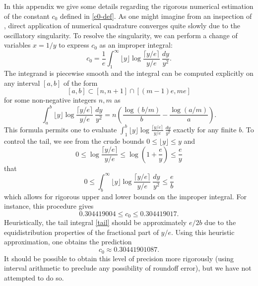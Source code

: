 \documentclass[12pt,a4paper,reqno]{amsart}
\numberwithin{equation}{section}
\theoremstyle{plain}
\theoremstyle{definition}
\begin{document}
In this appendix we give some details regarding the rigorous numerical estimation of the constant $c_0$ defined in \eqref{c0-def}.  As one might imagine from an inspection of , direct application of numerical quadrature converges quite slowly due to the oscillatory singularity.  To resolve the singularity, we can perform a change of variables $x=1/y$ to express $c_0$ as an improper integral:
\begin{equation}\label{c0-alt}
   c_0 = \frac{1}{e} \int_1^\infty \lfloor y \rfloor \log \frac{\lceil y/e \rceil}{y/e}\ \frac{dy}{y^2}.
\end{equation}
The integrand is piecewise smooth and the integral can be computed explicitly on any interval $[a,b]$ of the form
$$ [a,b] \subset [n, n+1] \cap [(m-1)e, me]$$
for some non-negative integers $n,m$ as
$$ \int_a^b \lfloor y \rfloor \log \frac{\lceil y/e \rceil}{y/e}\ \frac{dy}{y^2} = n (\frac{\log(b/m)}{b} - \frac{\log(a/m)}{a}).$$
This formula permits one to evaluate $\int_1^b \lfloor y \rfloor \log \frac{\lceil y/e \rceil}{y/e}\ \frac{dy}{y^2}$ exactly for any finite $b$.  To control the tail, we see from the crude bounds $0 \leq \lfloor y \rfloor \leq y$ and
$$ 0 \leq \log \frac{\lceil y/e \rceil}{y/e} \leq \log 
\left(1 + \frac{e}{y}\right) \leq \frac{e}{y}
$$
that
\begin{equation}\label{tail}
   0 \leq \int_b^\infty \lfloor y \rfloor \log \frac{\lceil y/e \rceil}{y/e}\ \frac{dy}{y^2} \leq \frac{e}{b}
\end{equation}
which allows for rigorous upper and lower bounds on the improper integral.  For instance, this procedure gives
$$ 0.304419004 \leq c_0 \leq 0.304419017.$$
Heuristically, the tail integral \eqref{tail} should be approximately $e/2b$ due to the equidistribution properties of the fractional part of $y/e$.  Using this heuristic approximation, one obtains the prediction
$$ c_0 \approx 0.30441901087.$$
It should be possible to obtain this level of precision more rigorously (using interval arithmetic to preclude any possibility of roundoff error), but we have not attempted to do so.
\end{document}
